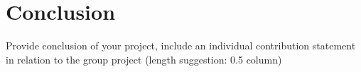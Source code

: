 \section{Conclusion}
\label{sec:conclusion}

Provide conclusion of your project, include an individual contribution statement in relation to the group project (length suggestion: 0.5 column)



